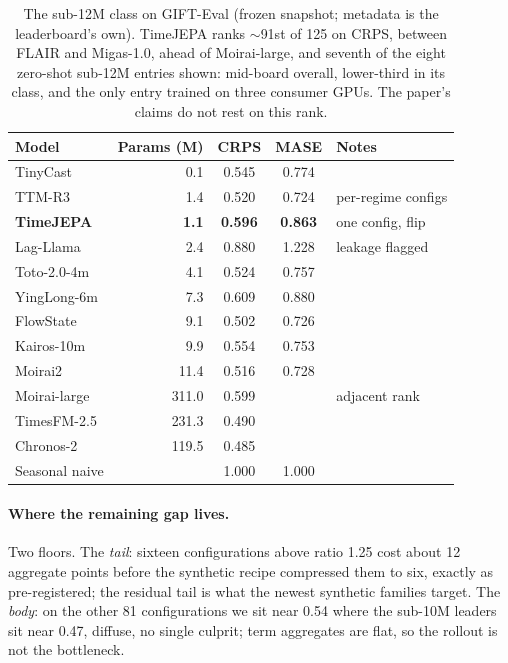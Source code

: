 \begin{table}[t]
\centering
\scriptsize
\begin{tabular}{lrccl}
\toprule
Model & Params (M) & CRPS & MASE & Notes \\
\midrule
TinyCast & 0.1 & 0.545 & 0.774 & \\
TTM-R3 & 1.4 & 0.520 & 0.724 & per-regime configs \\
\textbf{TimeJEPA} & \textbf{1.1} & \textbf{0.596} & \textbf{0.863} & one config, flip \\
Lag-Llama & 2.4 & 0.880 & 1.228 & leakage flagged \\
Toto-2.0-4m & 4.1 & 0.524 & 0.757 & \\
YingLong-6m & 7.3 & 0.609 & 0.880 & \\
FlowState & 9.1 & 0.502 & 0.726 & \\
Kairos-10m & 9.9 & 0.554 & 0.753 & \\
Moirai2 & 11.4 & 0.516 & 0.728 & \\
\midrule
Moirai-large & 311.0 & 0.599 & & adjacent rank \\
TimesFM-2.5 & 231.3 & 0.490 & & \\
Chronos-2 & 119.5 & 0.485 & & \\
Seasonal naive & & 1.000 & 1.000 & \\
\bottomrule
\end{tabular}
\caption{The sub-12M class on GIFT-Eval (frozen snapshot; metadata is
the leaderboard's own). TimeJEPA ranks $\sim$91st of 125 on CRPS,
between FLAIR and Migas-1.0, ahead of Moirai-large, and seventh of the
eight zero-shot sub-12M entries shown: mid-board overall, lower-third
in its class, and the only entry trained on three consumer GPUs. The
paper's claims do not rest on this rank.}
\label{tab:small-models}
\end{table}

\paragraph{Where the remaining gap lives.}
Two floors. The \emph{tail}: sixteen configurations above ratio 1.25
cost about 12 aggregate points before the synthetic recipe compressed
them to six, exactly as pre-registered; the residual tail is what the
newest synthetic families target. The \emph{body}: on the other 81
configurations we sit near 0.54 where the sub-10M leaders sit near
0.47, diffuse, no single culprit; term aggregates are flat, so the
rollout is not the bottleneck.

